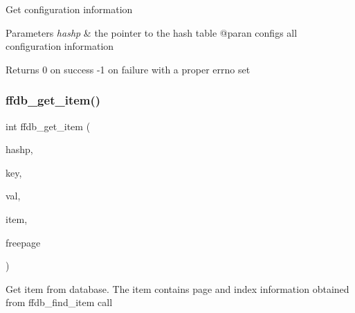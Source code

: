 Get configuration information


\begin{DoxyParams}{Parameters}
{\em hashp} & the pointer to the hash table @paran configs all configuration information\\
\hline
\end{DoxyParams}
\begin{DoxyReturn}{Returns}
0 on success -\/1 on failure with a proper errno set 
\end{DoxyReturn}
\mbox{\label{adat-devel_2other__libs_2filedb_2filehash_2ffdb__hash_8h_a01023f0331a47b7f4dd66a1ab2008356}} 
\subsubsection{\texorpdfstring{ffdb\_get\_item()}{ffdb\_get\_item()}}
{\footnotesize\ttfamily int ffdb\+\_\+get\+\_\+item (\begin{DoxyParamCaption}\item[{\mbox{\hyperlink{adat-devel_2other__libs_2filedb_2filehash_2ffdb__hash_8h_ae592010ed2bedc975d3cc0b7d074b9d1}{ffdb\+\_\+htab\+\_\+t}} $\ast$}]{hashp,  }\item[{const \mbox{\hyperlink{adat-devel_2other__libs_2filedb_2filehash_2ffdb__db_8h_aa2e0984399491df0fdd20898ca8758f9}{F\+F\+D\+B\+\_\+\+D\+BT}} $\ast$}]{key,  }\item[{\mbox{\hyperlink{adat-devel_2other__libs_2filedb_2filehash_2ffdb__db_8h_aa2e0984399491df0fdd20898ca8758f9}{F\+F\+D\+B\+\_\+\+D\+BT}} $\ast$}]{val,  }\item[{\mbox{\hyperlink{adat-devel_2other__libs_2filedb_2filehash_2ffdb__hash_8h_aa1cea5ccbd6513ed152988f7a71a936d}{ffdb\+\_\+hent\+\_\+t}} $\ast$}]{item,  }\item[{int}]{freepage }\end{DoxyParamCaption})}

Get item from database. The item contains page and index information obtained from ffdb\+\_\+find\+\_\+item call


